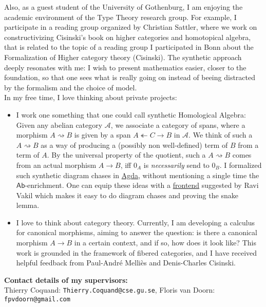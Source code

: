 \documentclass[12pt,headings=small,paper=A4,DIV=calc]{article}
\begin{document}
Also, as a guest student of the University of Gothenburg, I am enjoying the academic environment of the Type Theory research group. For example, I participate in a reading group organized by Christian Sattler, where we work on constructivizing Cisinski's book on higher categories and homotopical algebra, that is related to the topic of a reading group I participated in Bonn about the Formalization of Higher category theory (Cisinski). The synthetic approach deeply resonates with me: I wish to present mathematics easier, closer to the foundation, so that one sees what is really going on instead of beeing distracted by the formalism and the choice of model. \\
In my free time, I love thinking about private projects: 
\begin{itemize}
	\item I work one something that one could call synthetic Homological Algebra: Given any abelian category $\mathcal{A}$, we associate a category of spans, where a morphism $A \rightsquigarrow B$ is given by a span $A \twoheadleftarrow C \to B$ in $\mathcal{A}$. We think of such a $A \rightsquigarrow B$ as a way of producing a (possibly non well-defined) term of $B$ from a term of $A$. By the universal property of the quotient, such a $A \rightsquigarrow B$ comes from an actual morphism $A \to B$, iff $0_A$ is \emph{necessarily} send to $0_B$. I formalized such synthetic diagram chases in \href{https://github.com/timlichtnau/CarpetsOnAgda/blob/master/}{Agda}, without mentioning a single time the $\mathsf{Ab}$-enrichment. One can equip these ideas with a \href{https://www.3blue1brown.com/content/blog/exact-sequence-picturebook/PuzzlingThroughExactSequences.pdf}{frontend} suggested by Ravi Vakil which makes it easy to do diagram chases and proving the snake lemma. 
	\item  I love to think about category theory. Currently, I am developing a calculus for canonical morphisms, aiming to answer the question: is there a canonical morphism $A \to B$ in a certain context, and if so, how does it look like? This work is grounded in the framework of fibered categories, and I have received helpful feedback from Paul-André Melliès and Denis-Charles Cisinski. 
\end{itemize}
\textbf{Contact details of my supervisors:} \\
Thierry Coquand: \texttt{Thierry.Coquand@cse.gu.se}, Floris van Doorn: \texttt{fpvdoorn@gmail.com}
\end{document}
